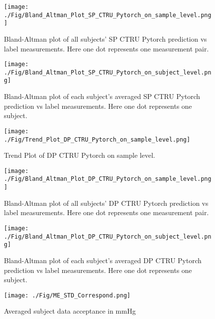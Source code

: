 \documentclass{article}
\begin{document}
\begin{figure}[H]
\centering
\texttt{[image: ./Fig/Bland\_Altman\_Plot\_SP\_CTRU\_Pytorch\_on\_sample\_level.png]}
\caption{Bland-Altman plot of all subjects' SP CTRU Pytorch prediction vs label measurements. Here one dot represents one measurement pair.}
\label{fig:image1}
\end{figure}

\begin{figure}[H]
\centering
\texttt{[image: ./Fig/Bland\_Altman\_Plot\_SP\_CTRU\_Pytorch\_on\_subject\_level.png]}
\caption{Bland-Altman plot of each subject's averaged SP CTRU Pytorch prediction vs label measurements. Here one dot represents one subject.}
\label{fig:image1}
\end{figure}

\begin{figure}[H]
\centering
\texttt{[image: ./Fig/Trend\_Plot\_DP\_CTRU\_Pytorch\_on\_sample\_level.png]}
\caption{Trend Plot of DP CTRU Pytorch on sample level.}
\label{fig:image1}
\end{figure}

\begin{figure}[H]
\centering
\texttt{[image: ./Fig/Bland\_Altman\_Plot\_DP\_CTRU\_Pytorch\_on\_sample\_level.png]}
\caption{Bland-Altman plot of all subjects' DP CTRU Pytorch prediction vs label measurements. Here one dot represents one measurement pair.}
\label{fig:image1}
\end{figure}

\begin{figure}[H]
\centering
\texttt{[image: ./Fig/Bland\_Altman\_Plot\_DP\_CTRU\_Pytorch\_on\_subject\_level.png]}
\caption{Bland-Altman plot of each subject's averaged DP CTRU Pytorch prediction vs label measurements. Here one dot represents one subject.}
\label{fig:image1}
\end{figure}


\begin{figure}[H]
\centering
\texttt{[image: ./Fig/ME\_STD\_Correspond.png]}
\caption{Averaged subject data acceptance in mmHg}
\label{ME_STD}
\end{figure}
\end{document}
